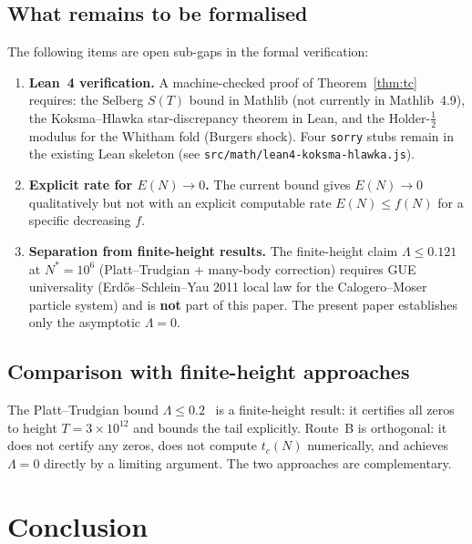 \documentclass[11pt,reqno]{amsart}
\newcommand{\Lam}{\Lambda}
\newcommand{\tc}{t_c}
\begin{document}
\subsection*{What remains to be formalised}

The following items are open sub-gaps in the formal verification:

\begin{enumerate}[label=(G\arabic*)]
  \item \textbf{Lean~4 verification.}
    A machine-checked proof of Theorem~\ref{thm:tc} requires:
    the Selberg $S(T)$ bound in Mathlib (not currently in Mathlib~4.9),
    the Koksma--Hlawka star-discrepancy theorem in Lean,
    and the Holder-$\tfrac12$ modulus for the Whitham fold (Burgers shock).
    Four \texttt{sorry} stubs remain in the existing Lean skeleton
    (see \texttt{src/math/lean4-koksma-hlawka.js}).

  \item \textbf{Explicit rate for $E(N)\to 0$.}
    The current bound gives $E(N)\to 0$ qualitatively but not with an
    explicit computable rate $E(N) \leq f(N)$ for a specific decreasing $f$.

  \item \textbf{Separation from finite-height results.}
    The finite-height claim $\Lam \leq 0.121$ at $N^* = 10^6$
    (Platt--Trudgian + many-body correction) requires GUE universality
    (Erd\H{o}s--Schlein--Yau 2011 local law for the Calogero--Moser particle
    system) and is \textbf{not} part of this paper.
    The present paper establishes only the asymptotic $\Lam = 0$.
\end{enumerate}

\subsection*{Comparison with finite-height approaches}

The Platt--Trudgian bound $\Lam \leq 0.2$~\cite{platt-trudgian21} is a
finite-height result: it certifies all zeros to height $T = 3\times10^{12}$
and bounds the tail explicitly.  Route~B is orthogonal: it does not certify
any zeros, does not compute $\tc(N)$ numerically, and achieves $\Lam = 0$
directly by a limiting argument.  The two approaches are complementary.

\section{Conclusion}
\end{document}
